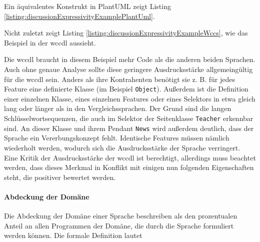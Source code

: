     

    Ein äquivalentes Konstrukt in PlantUML zeigt Listing
    \ref{listing:discussionExpressivityExamplePlantUml}.

    

    Nicht zuletzt zeigt Listing \ref{listing:discussionExpressivityExampleWccs},
    wie das Beispiel in der \gls{wccdl} aussieht.

    

    Die \gls{wccdl} braucht in diesem Beispiel mehr Code als die anderen beiden Sprachen.
    Auch ohne genaue Analyse sollte diese geringere Ausdrucksstärke
    allgemeingültig für die \gls{wccdl} sein.
    Anders als ihre Kontrahenten benötigt sie z. B. für jedes Feature eine definierte Klasse
    (im Beispiel \texttt{Object}).
    Außerdem ist die Definition einer einzelnen Klasse,
    eines einzelnen Features oder eines Selektors in etwa gleich lang oder länger
    als in den Vergleichssprachen.
    Der Grund sind die langen Schlüsselwortsequenzen,
    die auch im Selektor der Seitenklasse \texttt{Teacher}
    erkennbar sind.
    An dieser Klasse und ihrem Pendant \texttt{News}
    wird außerdem deutlich, dass der Sprache ein Vererbungskonzept fehlt.
    Identische Features müssen nämlich wiederholt werden,
    wodurch sich die Ausdrucksstärke der Sprache verringert.
    Eine Kritik der Ausdrucksstärke der \gls{wccdl} ist berechtigt,
    allerdings muss beachtet werden,
    dass dieses Merkmal in Konflikt mit einigen nun folgenden
    Eigenschaften steht, die positiver bewertet werden.


    \paragraph{Abdeckung der Domäne}
    Die Abdeckung der Domäne einer Sprache beschreiben
    \citet[Kapitel 4.2]{voelter:DslEngineering} als den
    prozentualen Anteil an allen Programmen der Domäne,
    die durch die Sprache formuliert werden können.
    Die formale Definition lautet

